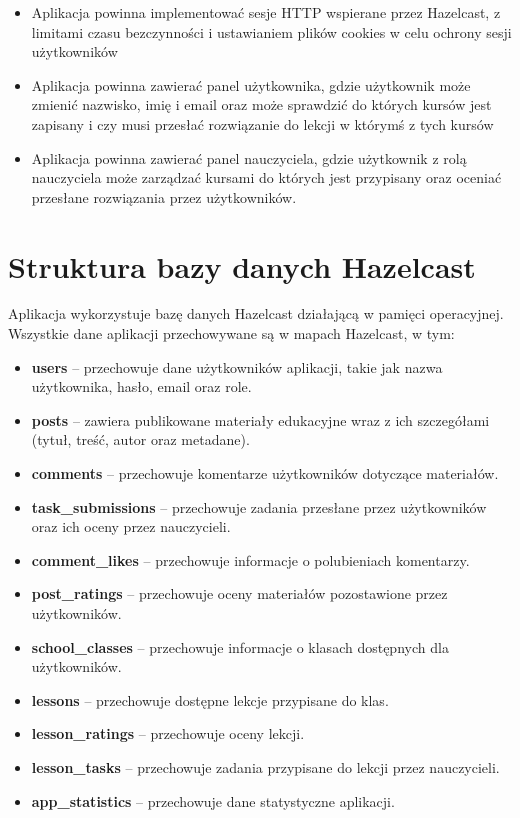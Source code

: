\begin{itemize}
\item Aplikacja powinna implementować sesje HTTP wspierane przez Hazelcast, z limitami czasu bezczynności i ustawianiem plików cookies w celu ochrony sesji użytkowników
\item Aplikacja powinna zawierać panel użytkownika, gdzie użytkownik może zmienić nazwisko, imię i email oraz może sprawdzić do których kursów jest zapisany i czy musi przesłać rozwiązanie do lekcji w którymś z tych kursów
\item Aplikacja powinna zawierać panel nauczyciela, gdzie użytkownik z rolą nauczyciela może zarządzać kursami do których jest przypisany oraz oceniać przesłane rozwiązania przez użytkowników.

\end{itemize}

\section{Struktura bazy danych Hazelcast}

Aplikacja wykorzystuje bazę danych Hazelcast działającą w pamięci operacyjnej. Wszystkie dane aplikacji przechowywane są w mapach Hazelcast, w tym:

\begin{itemize}
\item \textbf{users} – przechowuje dane użytkowników aplikacji, takie jak nazwa użytkownika, hasło, email oraz role.
\item \textbf{posts} – zawiera publikowane materiały edukacyjne wraz z ich szczegółami (tytuł, treść, autor oraz metadane).
\item \textbf{comments} – przechowuje komentarze użytkowników dotyczące materiałów.
 \item \textbf{task\_submissions} -- przechowuje zadania przesłane przez użytkowników oraz ich oceny przez nauczycieli.
  \item \textbf{comment\_likes} -- przechowuje informacje o polubieniach komentarzy.
  \item \textbf{post\_ratings} -- przechowuje oceny materiałów pozostawione przez użytkowników.
  \item \textbf{school\_classes} -- przechowuje informacje o klasach dostępnych dla użytkowników.
  \item \textbf{lessons} -- przechowuje dostępne lekcje przypisane do klas.
  \item \textbf{lesson\_ratings} -- przechowuje oceny lekcji.
  \item \textbf{lesson\_tasks} -- przechowuje zadania przypisane do lekcji przez nauczycieli.
  \item \textbf{app\_statistics} -- przechowuje dane statystyczne aplikacji.
  \end{itemize}

